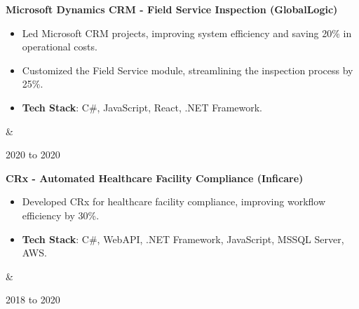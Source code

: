 \documentclass[10pt, letterpaper]{article}
\newenvironment{highlights}{
        \begin{itemize}[
                topsep=0pt,
                parsep=0.10 cm,
                partopsep=0pt,
                itemsep=0pt,
                after=\vspace{-1\baselineskip},
                leftmargin=0.4 cm + 3pt
            ]
    }{
        \end{itemize}
    } %
\let\originalTabularx\tabularx
\let\originalEndTabularx\endtabularx
\renewenvironment{tabularx}{\bgroup\centering\originalTabularx}{\originalEndTabularx\par\egroup}
\begin{document}
        \vspace{0.2 cm}
        \begin{tabularx}{
            \textwidth-0.4 cm-0.13cm
        }{
            K{0.2 cm}
            R{4.1 cm}
        }
            \textbf{Microsoft Dynamics CRM - Field Service Inspection (GlobalLogic)}

            \vspace{0.10 cm}

            \begin{highlights}
                \item Led Microsoft CRM projects, improving system efficiency and saving 20\% in operational costs.
                \item Customized the Field Service module, streamlining the inspection process by 25\%.
                \item \textbf{Tech Stack}: C\#, JavaScript, React, .NET Framework.
            \end{highlights}
            &
            

            2020 to 2020
        \end{tabularx}


        \vspace{0.2 cm}
        \begin{tabularx}{
            \textwidth-0.4 cm-0.13cm
        }{
            K{0.2 cm}
            R{4.1 cm}
        }
            \textbf{CRx - Automated Healthcare Facility Compliance (Inficare)}

            \vspace{0.10 cm}

            \begin{highlights}
                \item Developed CRx for healthcare facility compliance, improving workflow efficiency by 30\%.
                \item \textbf{Tech Stack}: C\#, WebAPI, .NET Framework, JavaScript, MSSQL Server, AWS.
            \end{highlights}
            &
            

            2018 to 2020
        \end{tabularx}
\end{document}
